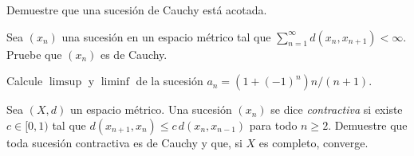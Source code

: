 \begin{exercise}
Demuestre que una sucesión de Cauchy está acotada.
\end{exercise}

\begin{exercise}
Sea $(x_n)$ una sucesión en un espacio métrico tal que $\sum_{n=1}^{\infty}d(x_n,x_{n+1})<\infty$. Pruebe que $(x_n)$ es de Cauchy.
\end{exercise}

\begin{exercise}
Calcule $\limsup$ y $\liminf$ de la sucesión $a_n=(1+(-1)^n)n/(n+1)$.
\end{exercise}

\begin{problem}
Sea $(X,d)$ un espacio métrico. Una sucesión $(x_n)$ se dice \emph{contractiva} si existe $c\in[0,1)$ tal que $d(x_{n+1},x_n)\leq c\,d(x_n,x_{n-1})$ para todo $n\geq 2$. Demuestre que toda sucesión contractiva es de Cauchy y que, si $X$ es completo, converge.
\end{problem}

